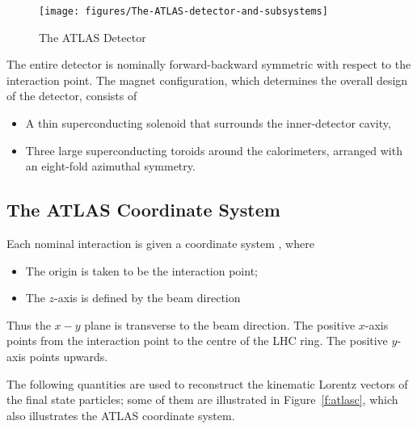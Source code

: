 \begin{figure}[H]
	\texttt{[image: figures/The-ATLAS-detector-and-subsystems]}
	\centering
	\caption{The ATLAS Detector}\cite{atlasdetector}
	\label{f:atlasd}
\end{figure}

The entire detector is nominally forward-backward symmetric with respect to the
interaction point. The magnet configuration, which determines the overall
design of the detector, consists of

\begin{itemize}
	\item A thin superconducting solenoid that surrounds the inner-detector cavity,

	\item Three large superconducting toroids around the calorimeters, arranged
	      with an eight-fold azimuthal symmetry.


\end{itemize}





\subsection{The ATLAS Coordinate System}

Each nominal interaction is given a coordinate system \cite{lhcaccexp}, where

\begin{itemize}
	\item The origin is taken to be the interaction point;
	\item The $z$-axis is defined by the beam direction
\end{itemize}

Thus the $x-y$ plane is transverse to the beam direction. The positive $x$-axis
points from the interaction point to the centre of the LHC ring. The positive
$y$-axis points upwards.

The following quantities are used to reconstruct the kinematic Lorentz vectors
of the final state particles; some of them are illustrated in
Figure~\ref{f:atlasc}, which also illustrates the ATLAS coordinate system.


